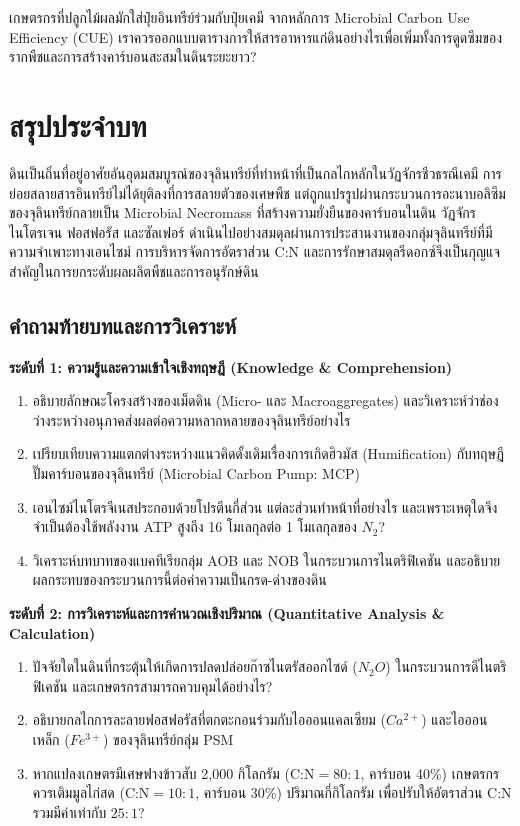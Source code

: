 \begin{insight}
เกษตรกรที่ปลูกไม้ผลมักใส่ปุ๋ยอินทรีย์ร่วมกับปุ๋ยเคมี จากหลักการ Microbial Carbon Use Efficiency (CUE) เราควรออกแบบตารางการให้สารอาหารแก่ดินอย่างไรเพื่อเพิ่มทั้งการดูดซึมของรากพืชและการสร้างคาร์บอนสะสมในดินระยะยาว?
\end{insight}

\section*{สรุปประจำบท}

ดินเป็นถิ่นที่อยู่อาศัยอันอุดมสมบูรณ์ของจุลินทรีย์ที่ทำหน้าที่เป็นกลไกหลักในวัฏจักรชีวธรณีเคมี การย่อยสลายสารอินทรีย์ไม่ได้ยุติลงที่การสลายตัวของเศษพืช แต่ถูกแปรรูปผ่านกระบวนการอะนาบอลิซึมของจุลินทรีย์กลายเป็น Microbial Necromass ที่สร้างความยั่งยืนของคาร์บอนในดิน วัฏจักรไนโตรเจน ฟอสฟอรัส และซัลเฟอร์ ดำเนินไปอย่างสมดุลผ่านการประสานงานของกลุ่มจุลินทรีย์ที่มีความจำเพาะทางเอนไซม์ การบริหารจัดการอัตราส่วน C:N และการรักษาสมดุลรีดอกซ์จึงเป็นกุญแจสำคัญในการยกระดับผลผลิตพืชและการอนุรักษ์ดิน

\subsection*{คำถามท้ายบทและการวิเคราะห์}

\noindent \textbf{ระดับที่ 1: ความรู้และความเข้าใจเชิงทฤษฎี (Knowledge \& Comprehension)}
\begin{enumerate}
    \item อธิบายลักษณะโครงสร้างของเม็ดดิน (Micro- และ Macroaggregates) และวิเคราะห์ว่าช่องว่างระหว่างอนุภาคส่งผลต่อความหลากหลายของจุลินทรีย์อย่างไร
    \item เปรียบเทียบความแตกต่างระหว่างแนวคิดดั้งเดิมเรื่องการเกิดฮิวมัส (Humification) กับทฤษฎีปั๊มคาร์บอนของจุลินทรีย์ (Microbial Carbon Pump: MCP)
    \item เอนไซม์ไนโตรจีเนสประกอบด้วยโปรตีนกี่ส่วน แต่ละส่วนทำหน้าที่อย่างไร และเพราะเหตุใดจึงจำเป็นต้องใช้พลังงาน ATP สูงถึง 16 โมเลกุลต่อ 1 โมเลกุลของ $N_2$?
    \item วิเคราะห์บทบาทของแบคทีเรียกลุ่ม AOB และ NOB ในกระบวนการไนตริฟิเคชัน และอธิบายผลกระทบของกระบวนการนี้ต่อค่าความเป็นกรด-ด่างของดิน
\end{enumerate}

\noindent \textbf{ระดับที่ 2: การวิเคราะห์และการคำนวณเชิงปริมาณ (Quantitative Analysis \& Calculation)}
\begin{enumerate}[resume]
    \item ปัจจัยใดในดินที่กระตุ้นให้เกิดการปลดปล่อยก๊าซไนตรัสออกไซด์ ($N_2O$) ในกระบวนการดีไนตริฟิเคชัน และเกษตรกรสามารถควบคุมได้อย่างไร?
    \item อธิบายกลไกการละลายฟอสฟอรัสที่ตกตะกอนร่วมกับไอออนแคลเซียม ($Ca^{2+}$) และไอออนเหล็ก ($Fe^{3+}$) ของจุลินทรีย์กลุ่ม PSM
    \item หากแปลงเกษตรมีเศษฟางข้าวสับ 2,000 กิโลกรัม ($\text{C:N} = 80:1$, คาร์บอน 40\%) เกษตรกรควรเติมมูลไก่สด ($\text{C:N} = 10:1$, คาร์บอน 30\%) ปริมาณกี่กิโลกรัม เพื่อปรับให้อัตราส่วน C:N รวมมีค่าเท่ากับ $25:1$?
\end{enumerate}

